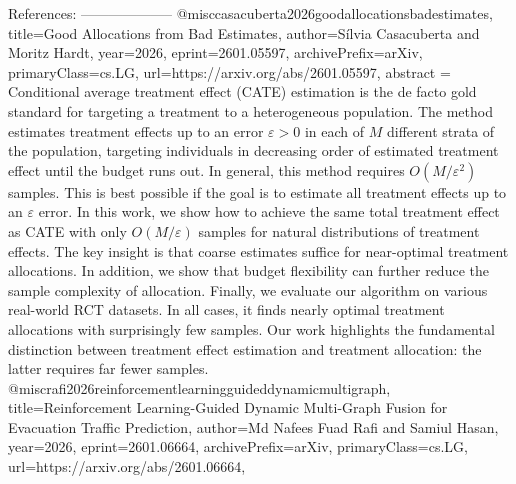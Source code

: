         References:
        --------------------
        @misc{casacuberta2026goodallocationsbadestimates,
      title={Good Allocations from Bad Estimates}, 
      author={Sílvia Casacuberta and Moritz Hardt},
      year={2026},
      eprint={2601.05597},
      archivePrefix={arXiv},
      primaryClass={cs.LG},
      url={https://arxiv.org/abs/2601.05597},
      abstract = {Conditional average treatment effect (CATE) estimation is the de facto gold standard for targeting a treatment to a heterogeneous population. The method estimates treatment effects up to an error $ε> 0$ in each of $M$ different strata of the population, targeting individuals in decreasing order of estimated treatment effect until the budget runs out. In general, this method requires $O(M/ε^2)$ samples. This is best possible if the goal is to estimate all treatment effects up to an $ε$ error. In this work, we show how to achieve the same total treatment effect as CATE with only $O(M/ε)$ samples for natural distributions of treatment effects. The key insight is that coarse estimates suffice for near-optimal treatment allocations. In addition, we show that budget flexibility can further reduce the sample complexity of allocation. Finally, we evaluate our algorithm on various real-world RCT datasets. In all cases, it finds nearly optimal treatment allocations with surprisingly few samples. Our work highlights the fundamental distinction between treatment effect estimation and treatment allocation: the latter requires far fewer samples.}
}@misc{rafi2026reinforcementlearningguideddynamicmultigraph,
      title={Reinforcement Learning-Guided Dynamic Multi-Graph Fusion for Evacuation Traffic Prediction}, 
      author={Md Nafees Fuad Rafi and Samiul Hasan},
      year={2026},
      eprint={2601.06664},
      archivePrefix={arXiv},
      primaryClass={cs.LG},
      url={https://arxiv.org/abs/2601.06664},
}

